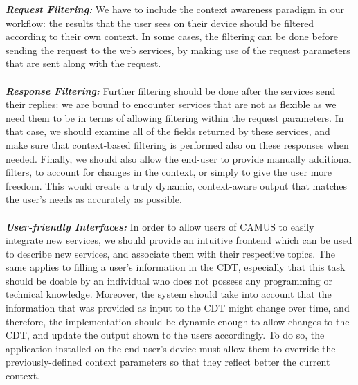\textbf{\textit{Request Filtering:}} We have to include the context awareness paradigm in our workflow: the results that the user sees on their device should be filtered according to their own context. In some cases, the filtering can be done before sending the request to the web services, by making use of the request parameters that are sent along with the request.\\\\
\textbf{\textit{Response Filtering:}} Further filtering should be done after the services send their replies: we are bound to encounter services that are not as flexible as we need them to be in terms of allowing filtering within the request parameters. In that case, we should examine all of the fields returned by these services, and make sure that context-based filtering is performed also on these responses when needed. Finally, we should also allow the end-user to provide manually additional filters, to account for changes in the context, or simply to give the user more freedom. This would create a truly dynamic, context-aware output that matches the user's needs as accurately as possible.\\\\
\textbf{\textit{User-friendly Interfaces:}} In order to allow users of CAMUS to easily integrate new services, we should provide an intuitive frontend which can be used to describe new services, and associate them with their respective topics. The same applies to filling a user's information in the CDT, especially that this task should be doable by an individual who does not possess any programming or technical knowledge. Moreover, the system should take into account that the information that was provided as input to the CDT might change over time, and therefore, the implementation should be dynamic enough to allow changes to the CDT, and update the output shown to the users accordingly. To do so, the application installed on the end-user's device must allow them to override the previously-defined context parameters so that they reflect better the current context.\\\\
